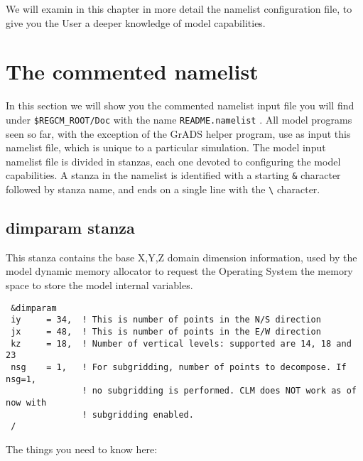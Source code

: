 %
%

We will examin in this chapter in more detail the namelist configuration file,
to give you the User a deeper knowledge of model capabilities.

\section{The commented namelist}

In this section we will show you the commented namelist input file you will
find under \verb=$REGCM_ROOT/Doc= with the name \verb=README.namelist= .
All model programs seen so far, with the exception of the GrADS helper program,
use as input this namelist file, which is unique to a particular simulation.
The model input namelist file is divided in stanzas, each one devoted to
configuring the model capabilities.
A stanza in the namelist is identified with a starting \verb=&= character
followed by stanza name, and ends on a single line with the \verb=\=
character.

\subsection{dimparam stanza}
\label{dimparam}

This stanza contains the base X,Y,Z domain dimension information, used
by the model dynamic memory allocator to request the Operating System the
memory space to store the model internal variables.

{\footnotesize
\begin{Verbatim}
 &dimparam
 iy     = 34,  ! This is number of points in the N/S direction
 jx     = 48,  ! This is number of points in the E/W direction
 kz     = 18,  ! Number of vertical levels: supported are 14, 18 and 23
 nsg    = 1,   ! For subgridding, number of points to decompose. If nsg=1,
               ! no subgridding is performed. CLM does NOT work as of now with
               ! subgridding enabled.
 /
\end{Verbatim}
}

The things you need to know here:

